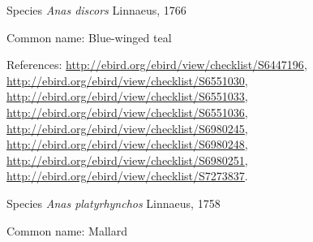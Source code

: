 \documentclass[9pt, article]{memoir}
\begin{document}
\begin{multicols}{2}
\vspace{6pt}\noindent\hspace{36pt}Species \textit{Anas discors} Linnaeus, 1766


Common name: Blue-winged teal

References: 
\url{http://ebird.org/ebird/view/checklist/S6447196}, 
\url{http://ebird.org/ebird/view/checklist/S6551030}, 
\url{http://ebird.org/ebird/view/checklist/S6551033}, 
\url{http://ebird.org/ebird/view/checklist/S6551036}, 
\url{http://ebird.org/ebird/view/checklist/S6980245}, 
\url{http://ebird.org/ebird/view/checklist/S6980248}, 
\url{http://ebird.org/ebird/view/checklist/S6980251}, 
\url{http://ebird.org/ebird/view/checklist/S7273837}.

\vspace{6pt}\noindent\hspace{36pt}Species \textit{Anas platyrhynchos} Linnaeus, 1758


Common name: Mallard


\end{multicols}
\end{document}
